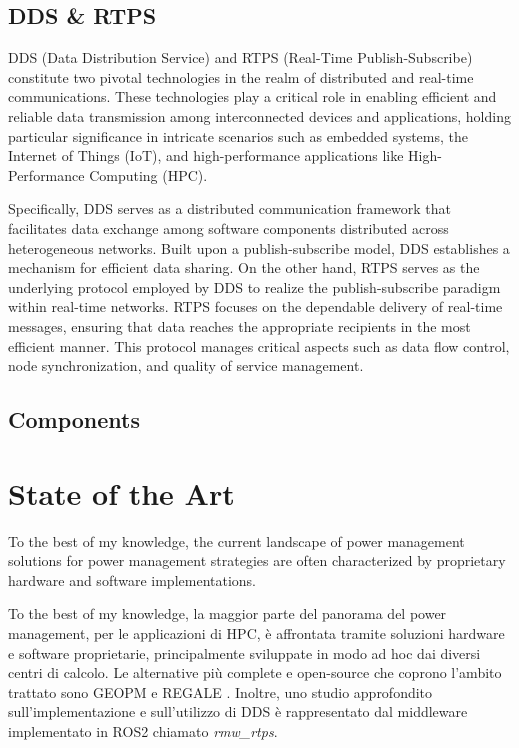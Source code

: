 \subsection{DDS \& RTPS}

DDS (Data Distribution Service) and RTPS (Real-Time Publish-Subscribe) constitute two pivotal technologies in the realm of distributed and real-time communications. These technologies play a critical role in enabling efficient and reliable data transmission among interconnected devices and applications, holding particular significance in intricate scenarios such as embedded systems, the Internet of Things (IoT), and high-performance applications like High-Performance Computing (HPC).

Specifically, DDS serves as a distributed communication framework that facilitates data exchange among software components distributed across heterogeneous networks. Built upon a publish-subscribe model, DDS establishes a mechanism for efficient data sharing. On the other hand, RTPS serves as the underlying protocol employed by DDS to realize the publish-subscribe paradigm within real-time networks. RTPS focuses on the dependable delivery of real-time messages, ensuring that data reaches the appropriate recipients in the most efficient manner. This protocol manages critical aspects such as data flow control, node synchronization, and quality of service management.

\subsection{Components}

\section{State of the Art} \label{SEC:soa}

To the best of my knowledge, the current landscape of power management solutions for power management strategies are often characterized by proprietary hardware and software implementations.

To the best of my knowledge, la maggior parte del panorama del power management, per le applicazioni di HPC, è affrontata tramite soluzioni hardware e software proprietarie, principalmente sviluppate in modo ad hoc dai diversi centri di calcolo. Le alternative più complete e open-source che coprono l'ambito trattato sono GEOPM \cite{GEOPM} e REGALE \cite{REGALE}. Inoltre, uno studio approfondito sull'implementazione e sull'utilizzo di DDS è rappresentato dal middleware implementato in ROS2 chiamato \emph{rmw\_rtps}.

